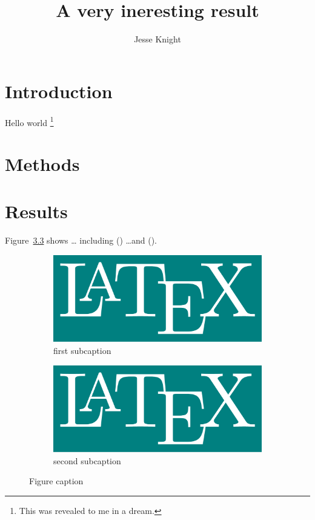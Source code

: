 \documentclass{ut-thesis}
\title{A very ineresting result}
\author{Jesse Knight}
\newcommand{\printchapterbibliography}{
  \printbibliography[heading=subbibliography,resetnumbers=true]}
\begin{document}
  \frontmatter
    \maketitle %
    \begin{abstract} %
      
    \end{abstract}
    \tableofcontents
    \listoffigures
    \listoftables
  \mainmatter
    \chapter{Introduction}
    Hello world%
    \footnote{This was revealed to me in a dream.}
    \cite{Last2021,Last2022}
    \printchapterbibliography
    \chapter{Methods}
    \cite{Last2022,Last2023}
    \printchapterbibliography
    \chapter{Results}
    Figure~\ref{fig:latex} shows \dots
    including () \dots and ().
    \begin{figure}[h]
      \begin{subfigure}{.5\linewidth}
        \includegraphics[width=\linewidth]{latex}
        \caption{first subcaption}
        \label{fig:latex.a}
      \end{subfigure}
      \begin{subfigure}{.5\linewidth}
        \includegraphics[width=\linewidth]{latex}
        \caption{second subcaption}
        \label{fig:latex.b}
      \end{subfigure}
      \caption{Figure caption}
      \label{fig:latex}
    \end{figure}
  \appendix
\end{document}
